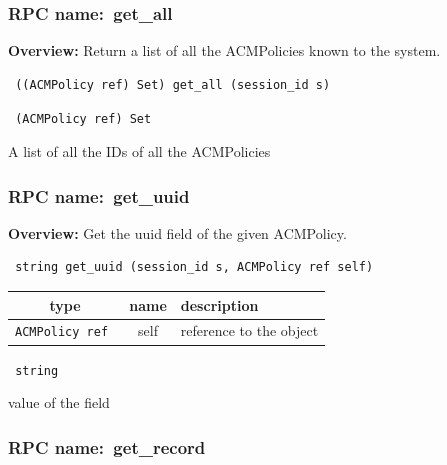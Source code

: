 \subsubsection{RPC name:~get\_all}

{\bf Overview:}
Return a list of all the ACMPolicies known to the system.

\begin{verbatim} ((ACMPolicy ref) Set) get_all (session_id s)\end{verbatim}


\vspace{0.3cm}

{\tt
(ACMPolicy ref) Set
}


A list of all the IDs of all the ACMPolicies
\vspace{0.3cm}
\vspace{0.3cm}
\vspace{0.3cm}
\subsubsection{RPC name:~get\_uuid}

{\bf Overview:}
Get the uuid field of the given ACMPolicy.

\begin{verbatim} string get_uuid (session_id s, ACMPolicy ref self)\end{verbatim}




\vspace{0.3cm}
\begin{tabular}{|c|c|p{7cm}|}
 \hline
{\bf type} & {\bf name} & {\bf description} \\ \hline
{\tt ACMPolicy ref } & self & reference to the object \\ \hline

\end{tabular}

\vspace{0.3cm}

{\tt
string
}


value of the field
\vspace{0.3cm}
\vspace{0.3cm}
\vspace{0.3cm}
\subsubsection{RPC name:~get\_record}

